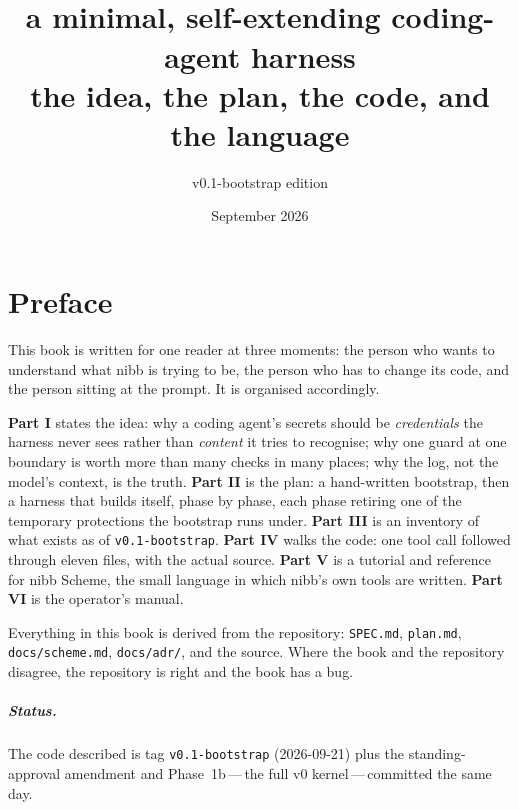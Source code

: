 \documentclass[11pt,a4paper,oneside]{book}
\title{\Huge\textbf{\nibb}\\[0.6em]\Large a minimal, self-extending coding-agent harness\\[0.4em]\large the idea, the plan, the code, and the language}
\author{v0.1-bootstrap edition}
\date{September 2026}
\newcommand{\nibb}{\textsf{nibb}}
\newcommand{\code}[1]{\texttt{#1}}
\newcommand{\file}[1]{\texttt{#1}}
\begin{document}
\frontmatter
\maketitle

\chapter*{Preface}

This book is written for one reader at three moments: the person who wants
to understand what \nibb{} is trying to be, the person who has to change its
code, and the person sitting at the prompt. It is organised accordingly.

\textbf{Part I} states the idea: why a coding agent's secrets should be
\emph{credentials} the harness never sees rather than \emph{content} it tries
to recognise; why one guard at one boundary is worth more than many checks
in many places; why the log, not the model's context, is the truth.
\textbf{Part II} is the plan: a hand-written bootstrap, then a harness that
builds itself, phase by phase, each phase retiring one of the temporary
protections the bootstrap runs under. \textbf{Part III} is an inventory of
what exists as of \code{v0.1-bootstrap}. \textbf{Part IV} walks the code: one
tool call followed through eleven files, with the actual source. \textbf{Part V}
is a tutorial and reference for \nibb{} Scheme, the small language in which
\nibb's own tools are written. \textbf{Part VI} is the operator's manual.

Everything in this book is derived from the repository: \file{SPEC.md},
\file{plan.md}, \file{docs/scheme.md}, \file{docs/adr/}, and the source.
Where the book and the repository disagree, the repository is right and the
book has a bug.

\paragraph{Status.} The code described is tag \code{v0.1-bootstrap}
(2026-09-21) plus the standing-approval amendment and Phase~1b\,---\,the full
v0 kernel\,---\,committed the same day.

\tableofcontents

\mainmatter






\appendix

\end{document}
